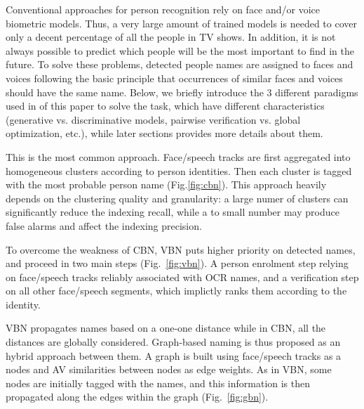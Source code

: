 Conventional approaches for person recognition rely on face and/or voice biometric models.
Thus, a very large amount of trained models is needed to cover only a decent percentage of all the people in
TV shows.
%
In addition, it is not always possible to predict which people will be the most important to find in the future.
%
To solve these problems, detected people names are assigned to faces and voices following the basic principle 
that occurrences of similar faces and voices should have the same name.
%
Below, we briefly introduce the 3 different paradigms used in of this paper  to solve the task,
which have different characteristics (generative vs. discriminative models, pairwise verification vs. global optimization, etc.), 
while later sections provides more details about them.
%

 This is the most common approach. Face/speech tracks are first aggregated into homogeneous clusters according to person identities. Then each cluster is tagged with the most probable person name (Fig.\ref{fig:cbn}). 
This approach heavily depends on the  clustering quality and granularity: 
a large numer of clusters can significantly reduce the 
indexing recall, while a to small number may produce false alarms and affect the indexing precision.


 To overcome the weakness of CBN, 
VBN puts higher priority on detected names, and proceed in two main steps (Fig.~\ref{fig:vbn}).
%
A person enrolment step relying on face/speech tracks reliably associated with OCR names, 
and a verification step on all other face/speech segments, which implictly ranks them according to the identity.


VBN propagates names based on a one-one distance while in CBN, all the distances are globally considered. 
Graph-based naming is thus proposed as an hybrid approach between them.
%
A graph is built using  face/speech tracks as a nodes and AV similarities between nodes as edge weights. 
As in VBN, some nodes are initially tagged with the names, and this information is then propagated along the edges 
within the graph (Fig.~\ref{fig:gbn}).


\endinput
